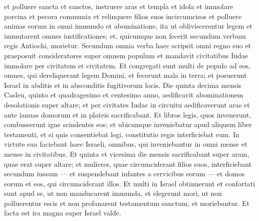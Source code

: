 \begin{biblechapter}
\verse et polluere sancta et sanctos, 
\verse instruere aras et templa et idola et immolare porcina et pecora communia 
 \verse et relinquere filios suos incircumcisos et polluere animas eorum in omni immundo et abominatione, 
\verse ita ut obliviscerentur legem et immutarent omnes iustificationes; 
\verse et, quicumque non fecerit secundum verbum regis Antiochi, morietur. 
\verse Secundum omnia verba haec scripsit omni regno suo et praeposuit consideratores super omnem populum et mandavit civitatibus Iudae immolare per civitatem et civitatem. 
\verse Et congregati sunt multi de populo ad eos, omnes, qui dereliquerant legem Domini, et fecerunt mala in terra; 
\verse et posuerunt Israel in abditis et in absconditis fugitivorum locis.
 \verse Die quinta decima mensis Casleu, quinto et quadragesimo et centesimo anno, aedificavit abominationem desolationis super altare; et per civitates Iudae in circuitu aedificaverunt aras 
\verse et ante ianuas domorum et in plateis sacrificabant. 
\verse Et libros legis, quos invenerunt, combusserunt igne scindentes eos; 
\verse et ubicumque inveniebatur apud aliquem liber testamenti, et si quis consentiebat legi, constitutio regis interficiebat eum. 
\verse In virtute sua faciebant haec Israeli, omnibus, qui inveniebantur in omni mense et mense in civitatibus. 
\verse Et quinta et vicesima die mensis sacrificabant super aram, quae erat super altare; 
\verse et mulieres, quae circumciderant filios suos, interficiebant secundum iussum 
\verse — et suspendebant infantes a cervicibus eorum — et domos eorum et eos, qui circumciderant illos. 
\verse Et multi in Israel obtinuerunt et confortati sunt apud se, ut non manducarent immunda, 
\verse et elegerunt mori, ut non polluerentur escis et non profanarent testamentum sanctum, et moriebantur. 
\verse Et facta est ira magna super Israel valde.
 

\end{biblechapter}
